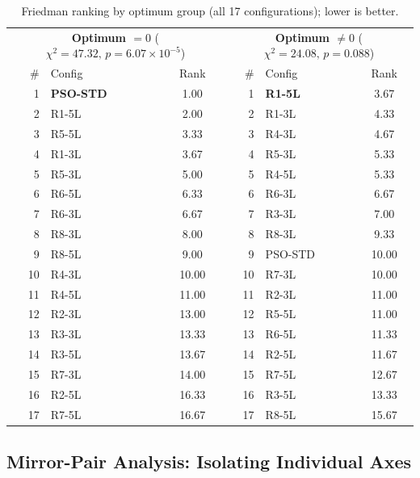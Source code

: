 \documentclass[runningheads]{llncs}
\begin{document}
\begin{table}[H]
\scriptsize
\caption{Friedman ranking by optimum group (all 17 configurations); lower is better.}\label{tab:friedman_byopt}
\centering
\setlength{\tabcolsep}{4pt}
\begin{tabular}{rlc | rlc}
\toprule
\multicolumn{3}{c|}{\textbf{Optimum $=0$} \quad ($\chi^2=47.32,\,p=6.07\!\times\!10^{-5}$)}
& \multicolumn{3}{c}{\textbf{Optimum $\neq 0$} \quad ($\chi^2=24.08,\,p=0.088$)} \\
\# & Config & Rank & \# & Config & Rank \\
\midrule
1  & \textbf{PSO-STD} & 1.00  & 1  & \textbf{R1-5L} & 3.67  \\
2  & R1-5L            & 2.00  & 2  & R1-3L          & 4.33  \\
3  & R5-5L            & 3.33  & 3  & R4-3L          & 4.67  \\
4  & R1-3L            & 3.67  & 4  & R5-3L          & 5.33  \\
5  & R5-3L            & 5.00  & 5  & R4-5L          & 5.33  \\
6  & R6-5L            & 6.33  & 6  & R6-3L          & 6.67  \\
7  & R6-3L            & 6.67  & 7  & R3-3L          & 7.00  \\
8  & R8-3L            & 8.00  & 8  & R8-3L          & 9.33  \\
9  & R8-5L            & 9.00  & 9  & PSO-STD        & 10.00 \\
10 & R4-3L            & 10.00 & 10 & R7-3L          & 10.00 \\
11 & R4-5L            & 11.00 & 11 & R2-3L          & 11.00 \\
12 & R2-3L            & 13.00 & 12 & R5-5L          & 11.00 \\
13 & R3-3L            & 13.33 & 13 & R6-5L          & 11.33 \\
14 & R3-5L            & 13.67 & 14 & R2-5L          & 11.67 \\
15 & R7-3L            & 14.00 & 15 & R7-5L          & 12.67 \\
16 & R2-5L            & 16.33 & 16 & R3-5L          & 13.33 \\
17 & R7-5L            & 16.67 & 17 & R8-5L          & 15.67 \\
\bottomrule
\end{tabular}
\end{table}
\subsection{Mirror-Pair Analysis: Isolating Individual Axes}\label{sec:mirror}
\end{document}
